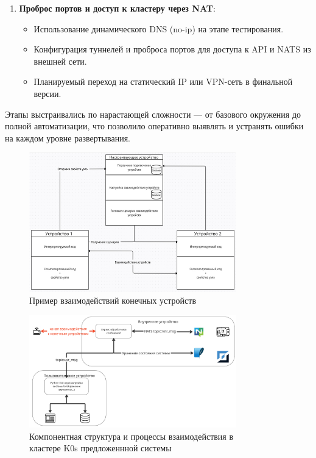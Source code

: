 \documentclass[14pt, a4paper]{extreport}
\begin{document}
\begin{enumerate}
\item \textbf{Проброс портов и доступ к кластеру через NAT}:
\begin{itemize}
\item Использование динамического DNS (no-ip) на этапе тестирования.
\item Конфигурация туннелей и проброса портов для доступа к API и NATS из внешней сети.
\item Планируемый переход на статический IP или VPN-сеть в финальной версии.
\end{itemize}
\end{enumerate}

Этапы выстраивались по нарастающей сложности — от базового окружения до полной автоматизации, что позволило оперативно выявлять и устранять ошибки на каждом уровне развертывания.




\begin{figure}[ht]
    \centering
    \includegraphics[width=0.8\textwidth]{images/Fig09.png}
    \caption{Пример взаимодействий конечных устройств}
    \label{fig:Connect_end_device_example}
\end{figure}


\begin{figure}[ht]
    \centering
    \includegraphics[width=0.8\textwidth]{images/InternalSystemDesign.png}
    \captionsetup{justification=centering}
    \caption{Компонентная структура и процессы взаимодействия в\\кластере K0s предложеннной системы}
    \label{fig:InternalSystemDesign}
\end{figure}
\end{document}
